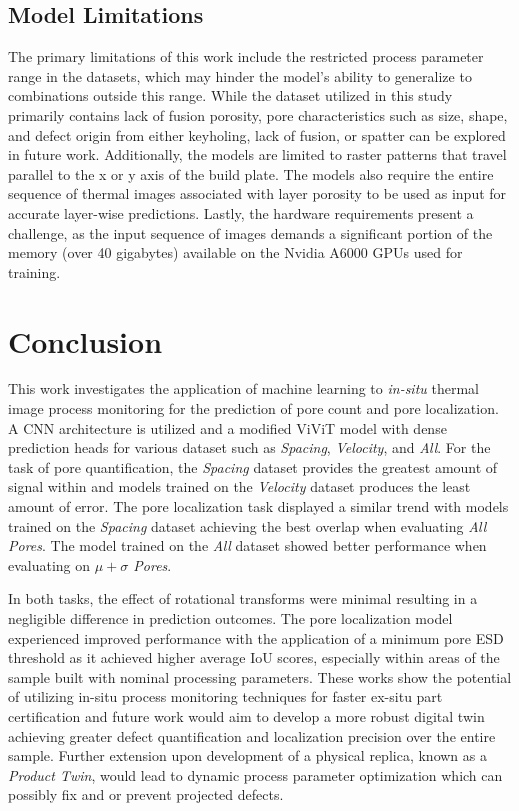 \subsection{Model Limitations}
The primary limitations of this work include the restricted process parameter
range in the datasets, which may hinder the model's ability to generalize to
combinations outside this range. While the dataset utilized in this study primarily contains lack of fusion porosity, pore characteristics such as size, shape, and defect origin from either keyholing, lack of fusion, or spatter can be explored in future work. Additionally,
the models are limited to raster patterns that travel parallel to the x or y
axis of the build plate. The models also require the entire sequence of thermal
images associated with layer porosity to be used as input for accurate
layer-wise predictions.  Lastly, the hardware requirements present a challenge,
as the input sequence of images demands a significant portion of the memory (over 40 gigabytes)
available on the Nvidia A6000 GPUs used for training.

\section{Conclusion}
This work investigates the application of machine learning to \textit{in-situ}
thermal image process monitoring for the prediction of pore count and pore
localization. A CNN architecture is utilized and a modified ViViT model with
dense prediction heads for various dataset such as \textit{Spacing},
\textit{Velocity}, and \textit{All}. For the task of pore quantification, the
\textit{Spacing} dataset provides the greatest amount of signal within and
models trained on the \textit{Velocity} dataset produces the least amount of
error. The pore localization task displayed a similar trend with models trained
on the \textit{Spacing} dataset achieving the best overlap when evaluating
\textit{All Pores}. The model trained on the \textit{All} dataset showed better
performance when evaluating on \textit{$\mu + \sigma$ Pores}.

In both tasks, the effect of rotational transforms were minimal resulting in a
negligible difference in prediction outcomes. The pore localization model
experienced improved performance with the application of a minimum pore ESD
threshold as it achieved higher average IoU scores, especially within areas of
the sample built with nominal processing parameters. These works show the
potential of utilizing in-situ process monitoring techniques for faster ex-situ
part certification and future work would aim to develop a more robust digital
twin achieving greater defect quantification and localization precision over the
entire sample. Further extension upon development of a physical replica, known
as a \textit{Product Twin}, would lead to dynamic process parameter optimization
which can possibly fix and or prevent projected defects.

